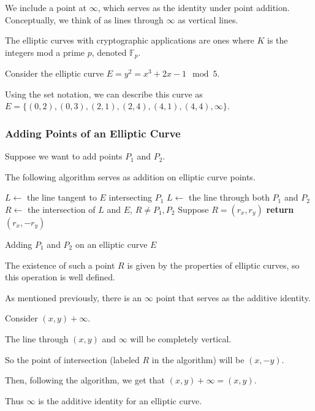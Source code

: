 We include a point at
$\infty$, which serves as the identity under point addition.
Conceptually, we think of as lines through $\infty$
as vertical lines.

The elliptic curves with cryptographic applications are ones where $K$ is the integers
mod a prime $p$, denoted $\mathbb{F}_p$.

\begin{example}
    Consider the elliptic curve $E = y^2 = x^3+2x-1 \mod 5$.

    Using the set notation, we can describe this curve as
    $E = \{(0 ,2 ),(0,3),(2,1),(2 ,4 ),(4,1),(4,4), \infty\}$.
\end{example}




\subsubsection{Adding Points of an Elliptic Curve}
Suppose we want to add points $P_1$ and $P_2$.

The following algorithm serves as addition on elliptic curve points.
\begin{algorithm}
    \begin{algorithmic}
        \State $L \gets$ the line tangent to $E$ intersecting $P_1$
        \Else
        \State $L \gets$ the line through both $P_1$ and $P_2$
        \EndIf
        \State $R \gets$ the intersection of $L$ and $E$, $R \neq P_1, P_2$
        \State Suppose $R = (r_x, r_y)$
        \State \textbf{return} $(r_x, -r_y)$
        \EndProcedure
    \end{algorithmic}
    \caption{Adding $P_1$ and $P_2$ on an elliptic curve $E$}
    \label{euclid}
\end{algorithm}

The existence of such a point $R$ is given by the properties of elliptic curves,
so this operation is well defined.

As mentioned previously, there is an $\infty$ point that serves as the additive identity.

\begin{example}
Consider $(x,y) + \infty$.

The line through $(x,y)$ and $\infty$ will be completely vertical.

So the point of intersection (labeled $R$ in the algorithm) will be $(x,-y)$.

Then, following the algorithm, we get that $(x,y) + \infty = (x,y)$.

Thus $\infty$ is the additive identity for an elliptic curve.
\end{example}




